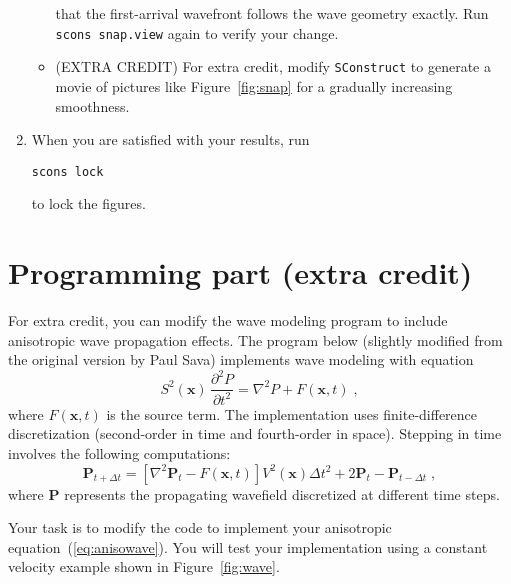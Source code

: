 \begin{enumerate}
\begin{itemize}
that the first-arrival wavefront follows the wave geometry exactly. Run \texttt{scons snap.view} again to verify your change.
\item (EXTRA CREDIT) For extra credit, modify  \texttt{SConstruct} to generate a movie of pictures like Figure~\ref{fig:snap} for a gradually increasing smoothness.
\end{itemize}
\item When you are satisfied with your results, run
\begin{verbatim}
scons lock
\end{verbatim}
to lock the figures.
\end{enumerate}

\lstset{language=python,numbers=left,numberstyle=\tiny,showstringspaces=false}


\section{Programming part (extra credit)}

For extra credit, you can modify the wave modeling program to include
anisotropic wave propagation effects. The program below (slightly
modified from the original version by Paul Sava) implements wave
modeling with equation
\begin{equation}
   \label{eq:isowave2}
      S^2(\mathbf{x})\,\frac{\partial^2 P}{\partial t^2} =
             \nabla^2 P + F(\mathbf{x},t)\;,
\end{equation} 
where $F(\mathbf{x},t)$ is the source term. The implementation uses
finite-difference discretization (second-order in time and fourth-order in space). 
Stepping in time involves the following computations:
\begin{equation}
\mathbf{P}_{t+\Delta t} = \left[ \nabla^2 \mathbf{P}_t - F(\mathbf{x},t)\right] V^2(\mathbf{x}) \Delta t^2 + 2 \mathbf{P}_{t} - \mathbf{P}_{t-\Delta t} \;,
\label{eq:step}
\end{equation}
where $\mathbf{P}$ represents the propagating wavefield discretized at different time steps.

\lstset{language=c,numbers=left,numberstyle=\tiny,showstringspaces=false}


Your task is to modify the code to implement your anisotropic
equation~(\ref{eq:anisowave}). You will test your implementation using a constant velocity example shown in Figure~\ref{fig:wave}.

